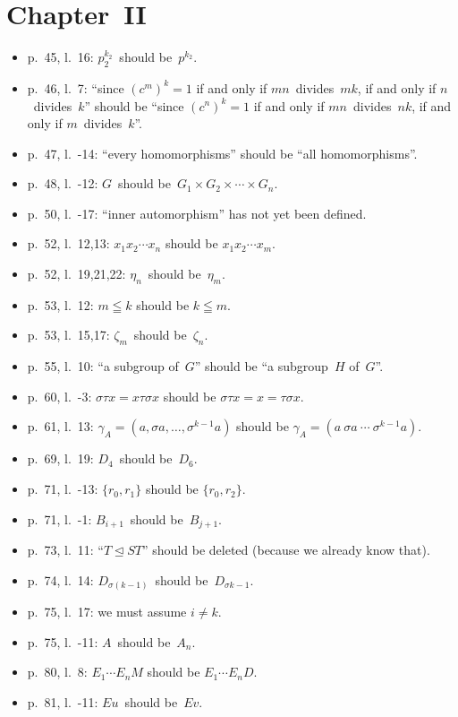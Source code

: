 \documentclass[letterpaper,12pt]{article}
\newcommand{\normal}{\trianglelefteq}
\begin{document}
\section*{Chapter~II}
\begin{itemize}
\item p.~45, l.~16: \(p_2^{k_2}\)~should be~\(p^{k_2}\).
\item p.~46, l.~7: ``since \((c^m)^k=1\) if and only if \(mn\)~divides~\(mk\), if and only if \(n\)~divides~\(k\)'' should be ``since \((c^n)^k=1\) if and only if \(mn\)~divides~\(nk\), if and only if \(m\)~divides~\(k\)''.
\item p.~47, l.~-14: ``every homomorphisms'' should be ``all homomorphisms''.
\item p.~48, l.~-12: \(G\)~should be~\(G_1\times G_2\times\cdots\times G_n\).
\item p.~50, l.~-17: ``inner automorphism'' has not yet been defined.
\item p.~52, l.~12,13: \(x_1x_2\cdots x_n\) should be \(x_1x_2\cdots x_m\).
\item p.~52, l.~19,21,22: \(\eta_n\)~should be~\(\eta_m\).
\item p.~53, l.~12: \(m\leqq k\) should be \(k\leqq m\).
\item p.~53, l.~15,17: \(\zeta_m\)~should be~\(\zeta_n\).
\item p.~55, l.~10: ``a subgroup of~\(G\)'' should be ``a subgroup~\(H\) of~\(G\)''.
\item p.~60, l.~-3: \(\sigma\tau x=x\tau\sigma x\) should be \(\sigma\tau x=x=\tau\sigma x\).
\item p.~61, l.~13: \(\gamma_A=(a,\sigma a,\ldots,\sigma^{k-1}a)\) should be \(\gamma_A=(a\ \sigma a\ \cdots\ \sigma^{k-1}a)\).
\item p.~69, l.~19: \(D_4\)~should be~\(D_6\).
\item p.~71, l.~-13: \(\{r_0,r_1\}\) should be \(\{r_0,r_2\}\).
\item p.~71, l.~-1: \(B_{i+1}\)~should be~\(B_{j+1}\).
\item p.~73, l.~11: ``\(T\normal ST\)'' should be deleted (because we already know that).
\item p.~74, l.~14: \(D_{\sigma(k-1)}\)~should be~\(D_{\sigma k-1}\).
\item p.~75, l.~17: we must assume \(i\ne k\).
\item p.~75, l.~-11: \(A\)~should be~\(A_n\).
\item p.~80, l.~8: \(E_1\cdots E_nM\) should be \(E_1\cdots E_n D\).
\item p.~81, l.~-11: \(Eu\)~should be~\(Ev\).

\end{itemize}
\end{document}
